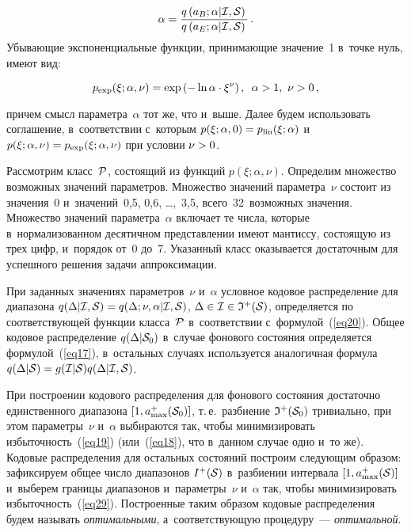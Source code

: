 \begin{multicols}{2}
\noindent
$$
\alpha = \displaystyle\frac{\displaystyle q\left(a_B;\alpha|{\cal I},{\cal S}\right)\mathstrut}{\displaystyle q\left(a_E;\alpha|{\cal I},
{\cal S}\right)\mathstrut}\,.
$$
Убывающие экспоненциальные функции, принимающие значение~1 в~точке нуль, имеют вид:

\noindent
$$
p_{\exp}(\xi;\alpha,\nu) = \exp\left(-\ln\alpha\cdot\xi^\nu\right), 
\enskip \alpha>1,\ \nu>0\,,
$$

\pagebreak

\noindent
причем смысл параметра~$\alpha$ тот же, что и~выше. Далее будем использовать 
соглашение, в~соответствии с~которым $p(\xi;\alpha,0)\hm= p_{\mathrm{lin}}
(\xi;\alpha)$  и~$p(\xi;\alpha,\nu)\hm= p_{\exp}(\xi;\alpha,\nu)$ при условии 
$\nu\hm> 0$.



Рассмотрим класс~${\cal P}$, состоящий из функций $p(\xi ;\alpha,\nu)$. 
Определим множество возможных значений параметров. Множество значений параметра~$\nu$ 
состоит из значения~0 и~значений~0,5, 0,6, \ldots,~3,5, всего~32~возможных значения. 
Множество значений параметра~$\alpha$ включает те числа, которые в~нормализованном 
десятичном представлении имеют мантиссу, состоящую из трех цифр, и~порядок от~0 
до~7. Указанный класс оказывается достаточным для успешного решения задачи 
аппроксимации.

При заданных значениях параметров~$\nu$ и~$\alpha$  условное кодовое 
распределение для диапазона $q(\Delta|{\cal I},{\cal S}) \hm= 
q(\Delta;\nu,\alpha|{\cal I},{\cal S})$, $\Delta\hm\in{\cal I}\hm\in{\frak I}^+({\cal S})$, 
определяется по соответствующей функции класса~${\cal P}$  в~соответствии 
с~формулой~(\ref{eq20}). Общее кодовое распределение $q(\Delta|{\cal S}_0)$ 
в~случае фонового со\-сто\-яния определяется формулой~(\ref{eq17}), 
в~остальных случаях используется аналогичная формула $q(\Delta|{\cal S})\hm= 
g({\cal I}|{\cal S})q(\Delta|{\cal I},{\cal S})$.

При построении кодового распределения для фонового состояния 
достаточно единственного диапазона $[1,a_{\max}^+({\cal S}_0)]$, т.\,е.\
 разбиение ${\frak I}^+({\cal S}_0)$ тривиально, при этом параметры~$\nu$ 
 и~$\alpha$  выбираются так, чтобы минимизировать избыточность~(\ref{eq19}) 
 (или~(\ref{eq18}), что в~данном случае одно и~то же). Кодовые распределения 
 для остальных состояний построим следующим образом: зафиксируем общее 
 число диапазонов  $I^+({\cal S})$ в~разбиении интервала $[1,a_{\max}^+({\cal S})]$ 
 и~выберем границы диапазонов и~параметры~$\nu$ и~$\alpha$ так, чтобы 
 минимизировать избыточность~(\ref{eq29}). Построенные таким образом кодовые 
 распределения будем называть \textit{оптимальными}, а~соответствующую процедуру~--- 
 \textit{оптимальной}.
 {
 
}
\end{multicols}
